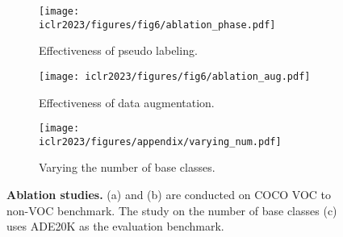 \documentclass{article} \usepackage{iclr2023_conference,times}
\begin{document}
\begin{figure}[t]\centering
    \begin{subfigure}[b]{0.33\textwidth}
         \centering
         \texttt{[image: iclr2023/figures/fig6/ablation\_phase.pdf]}
    \caption{Effectiveness of pseudo labeling.}
         \label{fig:plr_effectiveness}
     \end{subfigure}
     \hfill
     \begin{subfigure}[b]{0.4\textwidth}
         \centering
         \texttt{[image: iclr2023/figures/fig6/ablation\_aug.pdf]}
         \caption{Effectiveness of data augmentation.}
         \label{fig:aug_effectiveness}
     \end{subfigure}
     \hfill
     \begin{subfigure}[b]{0.255\textwidth}
         \centering
         \texttt{[image: iclr2023/figures/appendix/varying\_num.pdf]}
         \caption{Varying the number of base classes.}
         \label{fig:base_classes}
     \end{subfigure}
  \caption{\textbf{Ablation studies.} (a) and (b) are conducted on COCO VOC to non-VOC benchmark. The study on the number of base classes (c) uses ADE20K as the evaluation benchmark.}\label{fig:ablation}\vspace{-0.2em}
\end{figure}
\end{document}
